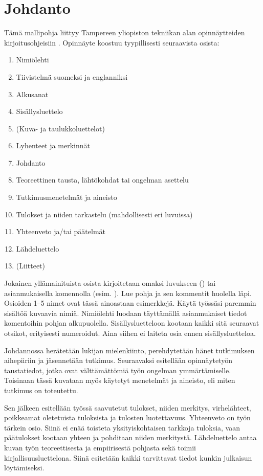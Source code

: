 \chapter{Johdanto}
\label{ch:johdanto}

Tämä mallipohja liittyy Tampereen yliopiston tekniikan alan opinnäytteiden kirjoitusohjeisiin \parencite{kirjoitusohje2018}. Opinnäyte koostuu tyypillisesti seuraavista osista:

\begin{enumerate}
    \item[{}] Nimiölehti
    \item[{}] Tiivistelmä suomeksi ja englanniksi
    \item[{}] Alkusanat
    \item[{}] Sisällysluettelo
    \item[{}] (Kuva- ja taulukkoluettelot)
    \item[{}] Lyhenteet ja merkinnät
    \item Johdanto
    \item Teoreettinen tausta, lähtökohdat tai ongelman asettelu
    \item Tutkimusmenetelmät ja aineisto
    \item Tulokset ja niiden tarkastelu (mahdollisesti eri luvuissa)
    \item Yhteenveto ja/tai päätelmät
    \item[{}] Lähdeluettelo
    \item[{}] (Liitteet)
\end{enumerate}

Jokainen yllämainituista osista kirjoitetaan omaksi luvukseen () tai asianmukaisella komennolla (esim. ). Lue pohja ja sen kommentit huolella läpi. Osioiden 1--5 nimet ovat tässä ainoastaan esimerkkejä. Käytä työssäsi paremmin sisältöä kuvaavia nimiä. Nimiölehti luodaan täyttämällä asianmukaiset tiedot komentoihin pohjan alkupuolella. Sisällysluetteloon kootaan kaikki sitä seuraavat otsikot, erityisesti numeroidut. Aina siihen ei laiteta osia ennen sisällysluetteloa.

Johdannossa herätetään lukijan mielenkiinto, perehdytetään hänet tutkimuksen aihepiiriin ja jäsennetään tutkimus. Seuraavaksi esitellään opinnäytetyön taustatiedot, jotka ovat välttämättömiä työn ongelman ymmärtämiselle. Toisinaan tässä kuvataan myös käytetyt menetelmät ja aineisto, eli miten tutkimus on toteutettu.

Sen jälkeen esitellään työssä saavutetut tulokset, niiden merkitys, virhelähteet, poikkeamat oletetuista tuloksista ja tulosten luotettavuus. Yhteenveto on työn tärkein osio. Siinä ei enää toisteta yksityiskohtaisen tarkkoja tuloksia, vaan päätulokset kootaan yhteen ja pohditaan niiden merkitystä. Lähdeluettelo antaa kuvan työn teoreettisesta ja empiirisestä pohjasta sekä toimii kirjallisuusluettelona. Siinä esitetään kaikki tarvittavat tiedot kunkin julkaisun löytämiseksi.


